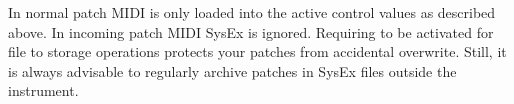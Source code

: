 In normal \presetmode patch MIDI is only loaded into the active control values as described above. In \livemode incoming patch MIDI SysEx is ignored. Requiring \patchmgmt to be activated for file to storage operations protects your patches from accidental overwrite. Still, it is always advisable to regularly archive patches in SysEx files outside the instrument.

